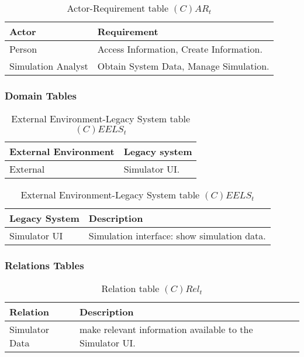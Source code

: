 \begin{table}[H]
	\centering
	\begin{tabular}{|p{4cm}|p{8cm}|}
			\hline
			\textbf{Actor} & \textbf{Requirement} \\
			\hline
			Person & Access Information, Create Information. \\
			\hline
			Simulation Analyst & Obtain System Data, Manage Simulation. \\
			\hline
		\end{tabular}
	\caption{Actor-Requirement table $(C)AR_t$}
	\label{tab:cart}
\end{table}

\subsubsection*{Domain Tables}

\begin{table}[H]
	\centering
	\begin{tabular}{|p{4cm}|p{8cm}|}
			\hline
			\textbf{External Environment} & \textbf{Legacy system} \\
			\hline
			External & Simulator UI. \\
			\hline
		\end{tabular}
	\caption{External Environment-Legacy System table $(C)EELS_t$}
	\label{tab:ceelst}
\end{table}

\begin{table}[H]
	\centering
	\begin{tabular}{|p{4cm}|p{8cm}|}
			\hline
			\textbf{Legacy System} & \textbf{Description} \\
			\hline
			Simulator UI & Simulation interface: show simulation data. \\
			\hline
		\end{tabular}
	\caption{External Environment-Legacy System table $(C)EELS_t$}
	\label{tab:ceelst}
\end{table}

\subsubsection*{Relations Tables}

\begin{table}[H]
	\centering
	\begin{tabular}{|p{4cm}|p{8cm}|}
			\hline
			\textbf{Relation} & \textbf{Description} \\
			\hline
			Simulator Data & make relevant information available to the Simulator UI. \\
			\hline
		\end{tabular}
	\caption{Relation table $(C)Rel_t$}
	\label{tab:crelt}
\end{table}

